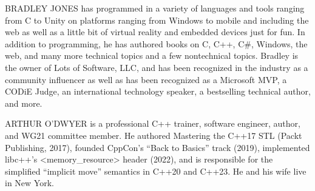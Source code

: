 BRADLEY JONES has programmed in a variety of languages and tools ranging from C to Unity on platforms ranging from Windows to mobile and including the web as well as a little bit of virtual reality and embedded devices just for fun. In addition to programming, he has authored books on C, C++, C\#, Windows, the web, and many more technical topics and a few nontechnical topics. Bradley is the owner of Lots of Software, LLC, and has been recognized in the industry as a community influencer as well as has been recognized as a Microsoft MVP, a CODiE Judge, an international technology speaker, a bestselling technical author, and more.

ARTHUR O’DWYER is a professional C++ trainer, software engineer, author, and WG21 committee member. He authored Mastering the C++17 STL (Packt Publishing, 2017), founded CppCon’s “Back to Basics” track (2019), implemented libc++’s <memory\_resource> header (2022), and is responsible for the simplified “implicit move” semantics in C++20 and C++23. He and his wife live in New York.